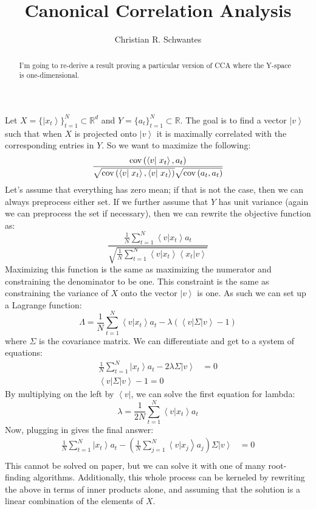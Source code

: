\documentclass[onecolumn,floatfix,nofootinbib,aps,notitlepage]{revtex4-1}
\newcommand{\bra}[1]{\ensuremath{\left\langle#1\right|}}
\newcommand{\ket}[1]{\ensuremath{\left|#1\right\rangle}}
\newcommand{\braket}[2]{\ensuremath{\left\langle#1\right|\left.#2\right\rangle}}
\begin{document}
\title{Canonical Correlation Analysis}
\author{Christian R. Schwantes}
\begin{abstract}
I'm going to re-derive a result proving a particular version of CCA where the Y-space is one-dimensional.
\end{abstract}
\maketitle

Let $X = \{\ket{x_t}\}_{t=1}^N \subset \mathbb{R}^d$ and $Y = \{a_t\}_{t=1}^N \subset \mathbb{R}$. The goal is to find a vector $\ket{v}$ such that when $X$ is projected onto $\ket{v}$ it is maximally correlated with the corresponding entries in $Y$. So we want to maximize the following:
$$ \frac{\textnormal{cov}\left(\braket{v}{x_t}, a_t\right)}{\sqrt{\textnormal{cov}\left(\braket{v}{x_t}, \braket{v}{x_t}\right)}
 \sqrt{\textnormal{cov}\left(a_t, a_t\right)}}$$ Let's assume that everything has zero mean; if that is not the case, then we can always preprocess either set. If we further assume that $Y$ has unit variance (again we can preprocess the set if necessary), then we can rewrite the objective function as:
$$ \frac{\frac{1}{N}\sum_{t=1}^N \braket{v}{x_t} a_t}
	{\sqrt{\frac{1}{N}\sum_{t=1}^N \braket{v}{x_t}\braket{x_t}{v}}}$$ Maximizing this function is the same as maximizing the numerator and constraining the denominator to be one. This constraint is the same as constraining the variance of $X$ onto the vector $\ket{v}$ is one. As such we can set up a Lagrange function:
$$ \Lambda = \frac{1}{N} \sum_{t=1}^N \braket{v}{x_t} a_t - \lambda \left(\bra{v}\Sigma\ket{v} - 1\right) $$ where $\Sigma$ is the covariance matrix. We can differentiate and get to a system of equations:
\begin{align*} 
\frac{1}{N} \sum_{t=1}^N \ket{x_t} a_t - 2 \lambda \Sigma \ket{v} &= 0 \\
\bra{v}\Sigma\ket{v} - 1 = 0 
\end{align*} By multiplying on the left by $\bra{v}$, we can solve the first equation for lambda:
$$ \lambda = \frac{1}{2N} \sum_{t=1}^N \braket{v}{x_t} a_t $$ Now, plugging in gives the final answer:
\begin{align*}
\frac{1}{N} \sum_{t=1}^N \ket{x_t}a_t - \left(\frac{1}{N}\sum_{j=1}^N \braket{v}{x_j}a_j\right) \Sigma \ket{v} &= 0\\
\end{align*} This cannot be solved on paper, but we can solve it with one of many root-finding algorithms. Additionally, this whole process can be kerneled by rewriting the above in terms of inner products alone, and assuming that the solution is a linear combination of the elements of $X$.
\end{document}
